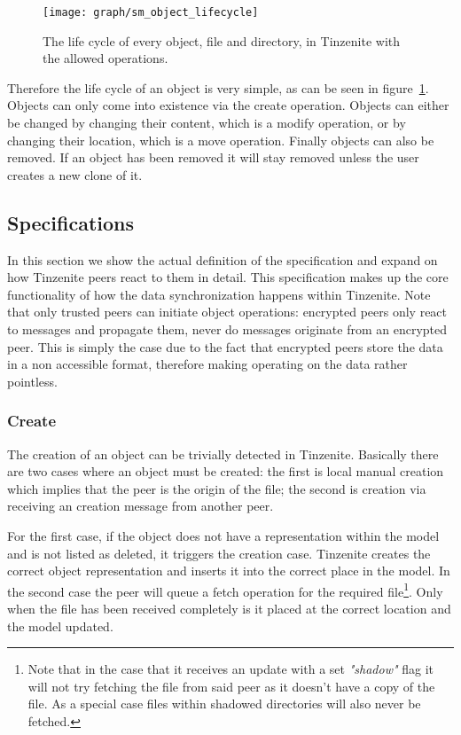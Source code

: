 \begin{figure}[htp]
\centering
    \texttt{[image: graph/sm\_object\_lifecycle]}
\caption[Object State Diagram]{The life cycle of every object, file and directory, in Tinzenite with the allowed operations.}
\label{diagram:object_operations}
\end{figure}

Therefore the life cycle of an object is very simple, as can be seen in figure~\ref{diagram:object_operations}.
Objects can only come into existence via the create operation.
Objects can either be changed by changing their content, which is a modify operation, or by changing their location, which is a move operation.
Finally objects can also be removed.
If an object has been removed it will stay removed unless the user creates a new clone of it.

\subsection{Specifications}
\label{sub:Specifications}

In this section we show the actual definition of the specification and expand on how Tinzenite peers react to them in detail.
This specification makes up the core functionality of how the data synchronization happens within Tinzenite.
Note that only trusted peers can initiate object operations: encrypted peers only react to messages and propagate them, never do messages originate from an encrypted peer.
This is simply the case due to the fact that encrypted peers store the data in a non accessible format, therefore making operating on the data rather pointless.

\subsubsection{Create}
\label{subs:Create}

The creation of an object can be trivially detected in Tinzenite.
Basically there are two cases where an object must be created: the first is local manual creation which implies that the peer is the origin of the file; the second is creation via receiving an creation message from another peer.

For the first case, if the object does not have a representation within the model and is not listed as deleted, it triggers the creation case.
Tinzenite creates the correct object representation and inserts it into the correct place in the model.
In the second case the peer will queue a fetch operation for the required file\footnote{Note that in the case that it receives an update with a set \textit{"shadow"} flag it will not try fetching the file from said peer as it doesn't have a copy of the file. As a special case files within shadowed directories will also never be fetched.}.
Only when the file has been received completely is it placed at the correct location and the model updated.

